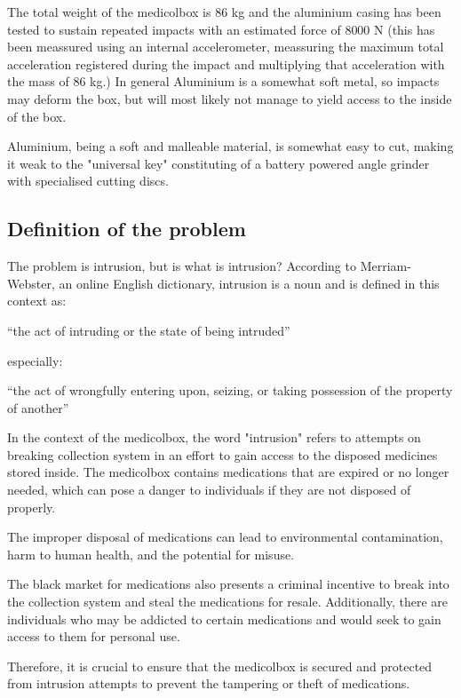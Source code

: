 \documentclass[../main.tex]{subfiles}
\begin{document}
The total weight of the \gls{medicolbox} is $86$ kg and the aluminium casing has been tested to sustain repeated impacts with an
estimated force of $8 000$ N (this has been meassured using an internal accelerometer,
meassuring the maximum total acceleration registered during the impact and multiplying that acceleration with the mass of $86$ kg.)
In general Aluminium is a somewhat soft metal, so impacts may deform the box, but will most likely not manage to yield access to the inside of the box.

Aluminium, being a soft and malleable material, is somewhat easy to cut, making it weak to the "universal key" constituting of a battery powered angle grinder with specialised cutting discs.


\subsection{Definition of the problem}
The problem is \gls{intrusion}, but is what is \gls{intrusion}?
According to Merriam-Webster,
an online English dictionary,
\gls{intrusion} is a noun and is defined in this context as:

\enquote{the act of intruding or the state of being intruded}\cite{definition-intrusion}

especially:

\enquote{the act of wrongfully entering upon, seizing,
or taking possession of the property of another}\cite{definition-intrusion}

In the context of the \gls{medicolbox}, the word
"\gls{intrusion}" refers to attempts on breaking collection system
in an effort to gain access to the disposed medicines stored inside.
The \gls{medicolbox} contains medications that are
expired or no longer needed, which can pose a danger to
individuals if they are not disposed of properly\cite{peds}. 

The improper disposal of medications can lead to
environmental contamination, harm to human health,
and the potential for misuse.

The black market for medications also presents a criminal incentive
to break into the collection system and steal the medications for resale.
Additionally, there are individuals who may be addicted to certain
medications and would seek to gain access to them for personal use.

Therefore, it is crucial to ensure that the \gls{medicolbox} is secured
and protected from \gls{intrusion} attempts to prevent the
tampering or theft of medications.
\end{document}
